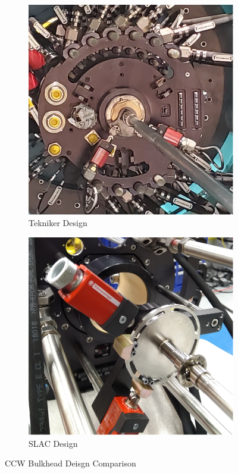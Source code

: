 \documentclass[SE,lsstdraft,authoryear,toc]{lsstdoc}
\begin{document}
\begin{figure}[h!]
  \centering
  \begin{subfigure}{0.45\linewidth}
    \centering
    \includegraphics[width=\linewidth]{media/teknikerDesign.png}
    \caption{Tekniker Design}
  \end{subfigure}
  \begin{subfigure}{0.45\linewidth}
    \centering
    \includegraphics[width=\linewidth]{media/slacDesign.png}
    \caption{SLAC Design}
  \end{subfigure}
  \caption{CCW Bulkhead Deisgn Comparison}
  \label{fig:Figure_3}
\end{figure}
\end{document}

